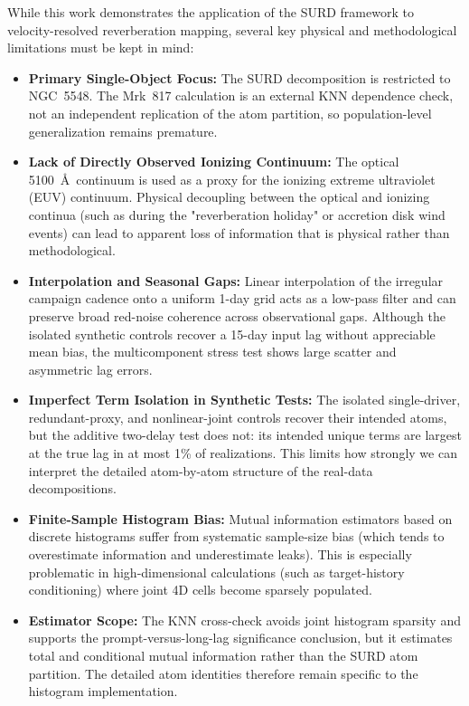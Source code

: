 \documentclass[fleqn,usenatbib]{mnras}
\begin{document}
While this work demonstrates the application of the SURD framework to velocity-resolved reverberation mapping, several key physical and methodological limitations must be kept in mind:
\begin{itemize}
\item \textbf{Primary Single-Object Focus:} The SURD decomposition is restricted to NGC~5548. The Mrk~817 calculation is an external KNN dependence check, not an independent replication of the atom partition, so population-level generalization remains premature.
\item \textbf{Lack of Directly Observed Ionizing Continuum:} The optical 5100~\AA\ continuum is used as a proxy for the ionizing extreme ultraviolet (EUV) continuum. Physical decoupling between the optical and ionizing continua (such as during the "reverberation holiday" or accretion disk wind events) can lead to apparent loss of information that is physical rather than methodological.
\item \textbf{Interpolation and Seasonal Gaps:} Linear interpolation of the irregular campaign cadence onto a uniform 1-day grid acts as a low-pass filter and can preserve broad red-noise coherence across observational gaps. Although the isolated synthetic controls recover a 15-day input lag without appreciable mean bias, the multicomponent stress test shows large scatter and asymmetric lag errors.
\item \textbf{Imperfect Term Isolation in Synthetic Tests:} The isolated single-driver, redundant-proxy, and nonlinear-joint controls recover their intended atoms, but the additive two-delay test does not: its intended unique terms are largest at the true lag in at most 1\% of realizations. This limits how strongly we can interpret the detailed atom-by-atom structure of the real-data decompositions.
\item \textbf{Finite-Sample Histogram Bias:} Mutual information estimators based on discrete histograms suffer from systematic sample-size bias (which tends to overestimate information and underestimate leaks). This is especially problematic in high-dimensional calculations (such as target-history conditioning) where joint 4D cells become sparsely populated.
\item \textbf{Estimator Scope:} The KNN cross-check avoids joint histogram sparsity and supports the prompt-versus-long-lag significance conclusion, but it estimates total and conditional mutual information rather than the SURD atom partition. The detailed atom identities therefore remain specific to the histogram implementation.

\end{itemize}
\end{document}
